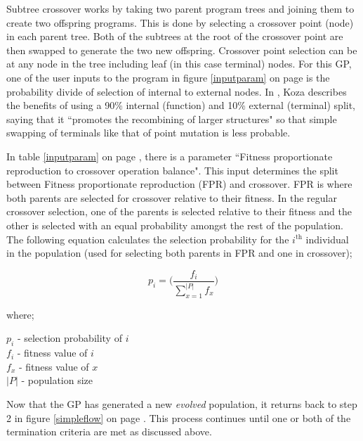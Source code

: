 \documentclass[a4paper,10.5pt]{article}
\begin{document}
Subtree crossover works by taking two parent program trees and joining them to create two offspring programs. This is done by selecting a crossover point (node) in each parent tree. Both of the subtrees at the root of the crossover point are then swapped to generate the two new offspring. Crossover point selection can be at any node in the tree including leaf (in this case terminal) nodes. For this GP, one of the user inputs to the program in figure \ref{inputparam} on page \pageref{inputparam} is the probability divide of selection of internal to external nodes. In \cite[p.114]{kozagpbook}, Koza describes the benefits of using a 90\% internal (function) and 10\% external (terminal) split, saying that it ``promotes the recombining of larger structures" so that simple swapping of terminals like that of point mutation is less probable.

In table \ref{inputparam} on page \pageref{inputparam}, there is a parameter ``Fitness proportionate reproduction to crossover operation balance". This input determines the split between Fitness proportionate reproduction (FPR) and crossover.  FPR is where both parents are selected for crossover relative to their fitness. In the regular crossover selection, one of the parents is selected relative to their fitness and the other is selected with an equal probability amongst the rest of the population. The following equation calculates the selection probability for the $i^{\text{th}}$ individual in the population (used for selecting both parents in FPR and one in crossover);\\
\begin{center}
\noindent\begin{minipage}{.3\linewidth}
\begin{equation*}
p_i = \Bigg( \frac{f_i}{\sum_{x=1}^{|P|} f_x} \Bigg)
\end{equation*}
\end{minipage}%
\begin{minipage}{.2\linewidth}
where;
\end{minipage}
\begin{minipage}{.3\linewidth}
$p_i$ - selection probability of $i$\\
$f_i$ - fitness value of $i$\\
$f_x$ - fitness value of $x$\\
$|P|$  - population size
\end{minipage}
\end{center}
Now that the GP has generated a new \emph{evolved} population, it returns back to step 2 in figure \ref{simpleflow} on page \pageref{simpleflow}. This process continues until one or both of the termination criteria are met as discussed above.
\end{document}
